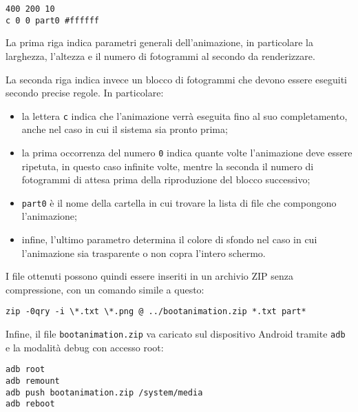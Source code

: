 \begin{verbatim}
400 200 10
c 0 0 part0 #ffffff
\end{verbatim}

La prima riga indica parametri generali dell'animazione, in particolare la larghezza, l'altezza e il numero di fotogrammi al secondo da renderizzare.

La seconda riga indica invece un blocco di fotogrammi che devono essere eseguiti secondo precise regole. In particolare:

\begin{itemize}
	\item la lettera \texttt{c} indica che l'animazione verrà eseguita fino al suo completamento, anche nel caso in cui il sistema sia pronto prima;
	\item la prima occorrenza del numero \texttt{0} indica quante volte l'animazione deve essere ripetuta, in questo caso infinite volte, mentre la seconda il numero di fotogrammi di attesa prima della riproduzione del blocco successivo;
	\item \texttt{part0} è il nome della cartella in cui trovare la lista di file che compongono l'animazione;
	\item infine, l'ultimo parametro determina il colore di sfondo nel caso in cui l'animazione sia trasparente o non copra l'intero schermo.
\end{itemize}

I file ottenuti possono quindi essere inseriti in un archivio ZIP senza compressione, con un comando simile a questo:

\begin{verbatim}
zip -0qry -i \*.txt \*.png @ ../bootanimation.zip *.txt part*
\end{verbatim}

Infine, il file \texttt{bootanimation.zip} va caricato sul dispositivo Android tramite \texttt{adb} e la modalità debug con accesso root:

\begin{verbatim}
adb root
adb remount
adb push bootanimation.zip /system/media
adb reboot
\end{verbatim}

